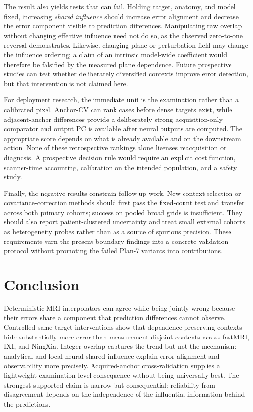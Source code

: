 \documentclass[10pt,twocolumn,letterpaper]{article}
\begin{document}
The result also yields tests that can fail. Holding target, anatomy, and model fixed, increasing \emph{shared influence} should increase error alignment and decrease the error component visible to prediction differences. Manipulating raw overlap without changing effective influence need not do so, as the observed zero-to-one reversal demonstrates. Likewise, changing plane or perturbation field may change the influence ordering; a claim of an intrinsic model-wide coefficient would therefore be falsified by the measured plane dependence. Future prospective studies can test whether deliberately diversified contexts improve error detection, but that intervention is not claimed here.

For deployment research, the immediate unit is the examination rather than a calibrated pixel. Anchor-CV can rank cases before dense targets exist, while adjacent-anchor differences provide a deliberately strong acquisition-only comparator and output PC is available after neural outputs are computed. The appropriate score depends on what is already available and on the downstream action. None of these retrospective rankings alone licenses reacquisition or diagnosis. A prospective decision rule would require an explicit cost function, scanner-time accounting, calibration on the intended population, and a safety study.

Finally, the negative results constrain follow-up work. New context-selection or covariance-correction methods should first pass the fixed-count test and transfer across both primary cohorts; success on pooled broad grids is insufficient. They should also report patient-clustered uncertainty and treat small external cohorts as heterogeneity probes rather than as a source of spurious precision. These requirements turn the present boundary findings into a concrete validation protocol without promoting the failed Plan-7 variants into contributions.

\section{Conclusion}
Deterministic MRI interpolators can agree while being jointly wrong because their errors share a component that prediction differences cannot observe. Controlled same-target interventions show that dependence-preserving contexts hide substantially more error than measurement-disjoint contexts across fastMRI, IXI, and NingXia. Integer overlap captures the trend but not the mechanism: analytical and local neural shared influence explain error alignment and observability more precisely. Acquired-anchor cross-validation supplies a lightweight examination-level consequence without being universally best. The strongest supported claim is narrow but consequential: reliability from disagreement depends on the independence of the influential information behind the predictions.

\clearpage
{\small


}
\end{document}
